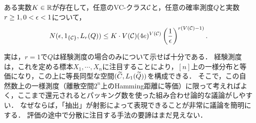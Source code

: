 \documentclass[uplatex,dvipdfmx]{jsreport}
\begin{document}
\begin{theorem}
    ある実数$K\in\mathbb{R}$が存在して，任意のVC-クラス$\mathcal{C}$と，任意の確率測度$Q$と実数$r\ge 1,0<\epsilon<1$について，
\[N(\epsilon,1_{\{\mathcal{C}\}},L_r(Q))\le K\cdot V(\mathcal{C})(4e)^{V(\mathcal{C})}\left(\frac{1}{\epsilon}\right)^{r(V(\mathcal{C})-1)}.\]
\end{theorem}
\begin{remarks}
    実は，$r=1$で$Q$は経験測度の場合のみについて示せば十分である．
    経験測度は，これを定める標本$X_1,\cdots,X_n$に注目することにより，$[n]$上の一様分布と等価になり，この上に等長同型な空間$(\widetilde{C},L_1(\widetilde{Q}))$を構成できる．
    そこで，この自然数上の一様測度（離散空間$2^n$上のHamming距離に等価）に限って考えればよく，ここまで還元されるとパッキング数を使った組み合わせ論的な議論がしやすい．
    なぜならば，「抽出」が射影によって表現できることが非常に議論を簡明にする．
    評価の途中で分散に注目する手法の要諦はまだ見えない．
\end{remarks}
\end{document}

